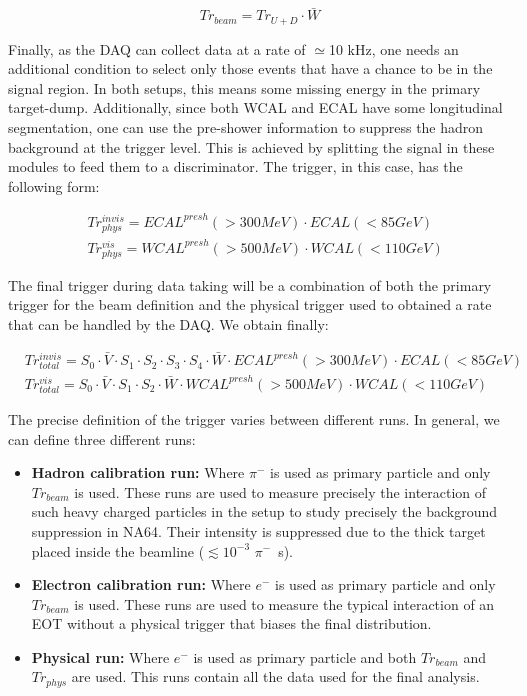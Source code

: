 \begin{equation}
\label{eq:trigger-beam}
Tr_{beam} = Tr_{U+D} \cdot \bar{W}
\end{equation}

Finally, as the DAQ can collect data at a rate of $\simeq$10 \si{kHz}, one needs an additional condition to select only those events that have a chance to be in the signal region. In both setups, this means some missing energy in the primary target-dump. Additionally, since both WCAL and ECAL have some longitudinal segmentation, one can use the pre-shower information to suppress the hadron background at the trigger level. This is achieved by splitting the signal in these modules to feed them to a discriminator. The trigger, in this case, has the following form:

\begin{equation}
\label{eq:trigger-phys}
\begin{split}
& Tr^{invis}_{phys} = ECAL^{presh}(>300 MeV) \cdot ECAL(<85 GeV)\\
& Tr^{vis}_{phys} = WCAL^{presh}(>500 MeV) \cdot WCAL(<110 GeV)
\end{split}
\end{equation}

The final trigger during data taking will be a combination of both the primary trigger for the beam definition and the physical trigger used to obtained a rate that can be handled by the DAQ. We obtain finally:

\begin{equation}
\label{eq:trigger-total}
\begin{split}
& Tr^{invis}_{total} = S_0 \cdot \bar{V} \cdot S_1 \cdot S_2 \cdot S_3 \cdot S_4 \cdot \bar{W} \cdot ECAL^{presh}(>300 MeV) \cdot ECAL(<85 GeV)\\
& Tr^{vis}_{total} = S_0 \cdot \bar{V} \cdot S_1 \cdot S_2\cdot \bar{W} \cdot WCAL^{presh}(>500 MeV) \cdot WCAL(<110 GeV)
\end{split}
\end{equation}

The precise definition of the trigger varies between different runs. In general, we can define three different runs:

\begin{itemize}
\item \textbf{Hadron calibration run:} Where $\pi^-$ is used as primary particle and only $Tr_{beam}$ is used. These runs are used to measure precisely the interaction of such heavy charged particles in the setup to study precisely the background suppression in NA64. Their intensity is suppressed due to the thick target placed inside the beamline ($\lesssim 10^{-3}$ $\pi^-$\si{\per\second}).
\item \textbf{Electron calibration run:} Where $e^-$ is used as primary particle and only $Tr_{beam}$ is used. These runs are used to measure the typical interaction of an EOT without a physical trigger that biases the final distribution. 
\item \textbf{Physical run:} Where $e^-$ is used as primary particle and both $Tr_{beam}$ and $Tr_{phys}$ are used. This runs contain all the data used for the final analysis. 
\end{itemize}

